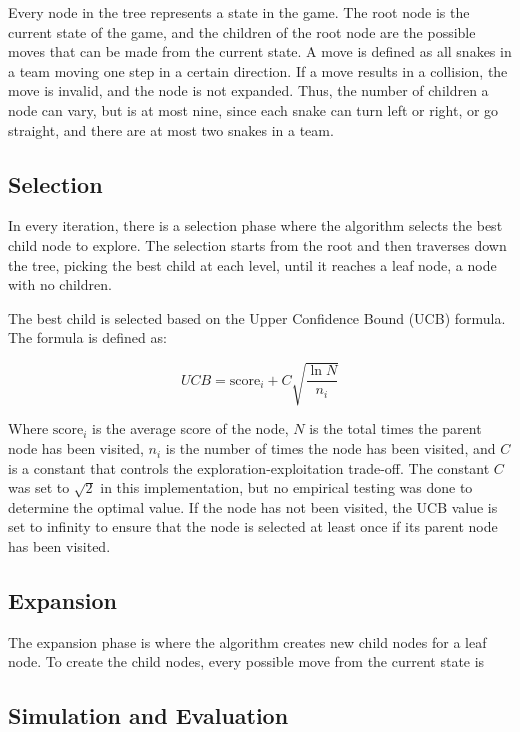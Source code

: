\documentclass[a4paper,12pt]{article}
\begin{document}
Every node in the tree represents a state in the game. The root node is the current state of the game, and the children of the root node are the possible moves that can be made from the current state. A move is defined as all snakes in a team moving one step in a certain direction. If a move results in a collision, the move is invalid, and the node is not expanded. Thus, the number of children a node can vary, but is at most nine, since each snake can turn left or right, or go straight, and there are at most two snakes in a team. %


\subsection{Selection}
In every iteration, there is a selection phase where the algorithm selects the best child node to explore. The selection starts from the root and then traverses down the tree, picking the best child at each level, until it reaches a leaf node, a node with no children.


The best child is selected based on the Upper Confidence Bound (UCB) formula. The formula is defined as:

\begin{equation}
    UCB = \text{score}_i + C \sqrt{\frac{\ln{N}}{n_i}}
\end{equation}

Where $\text{score}_i$ is the average score of the node, $N$ is the total times the parent node has been visited, $n_i$ is the number of times the node has been visited, and $C$ is a constant that controls the exploration-exploitation trade-off. The constant $C$ was set to $\sqrt{2}$ in this implementation, but no empirical testing was done to determine the optimal value. If the node has not been visited, the UCB value is set to infinity to ensure that the node is selected at least once if its parent node has been visited.


\subsection{Expansion}

The expansion phase is where the algorithm creates new child nodes for a leaf node. To create the child nodes, every possible move from the current state is 



\subsection{Simulation and Evaluation}
\end{document}
